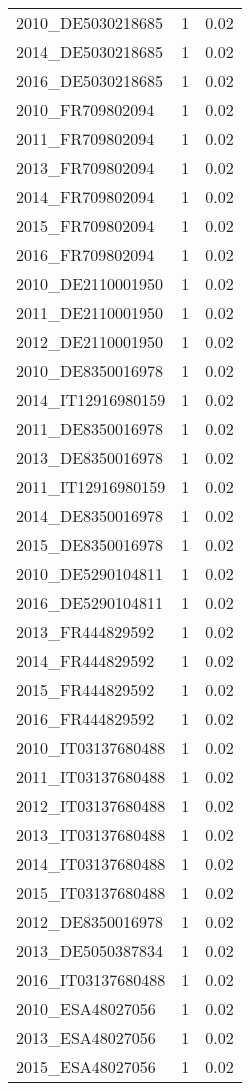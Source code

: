 \begin{table*}[htbp]
\begin{tabular}{lrr}
2010_DE5030218685 & 1 & 0.02 \\
2014_DE5030218685 & 1 & 0.02 \\
2016_DE5030218685 & 1 & 0.02 \\
2010_FR709802094 & 1 & 0.02 \\
2011_FR709802094 & 1 & 0.02 \\
2013_FR709802094 & 1 & 0.02 \\
2014_FR709802094 & 1 & 0.02 \\
2015_FR709802094 & 1 & 0.02 \\
2016_FR709802094 & 1 & 0.02 \\
2010_DE2110001950 & 1 & 0.02 \\
2011_DE2110001950 & 1 & 0.02 \\
2012_DE2110001950 & 1 & 0.02 \\
2010_DE8350016978 & 1 & 0.02 \\
2014_IT12916980159 & 1 & 0.02 \\
2011_DE8350016978 & 1 & 0.02 \\
2013_DE8350016978 & 1 & 0.02 \\
2011_IT12916980159 & 1 & 0.02 \\
2014_DE8350016978 & 1 & 0.02 \\
2015_DE8350016978 & 1 & 0.02 \\
2010_DE5290104811 & 1 & 0.02 \\
2016_DE5290104811 & 1 & 0.02 \\
2013_FR444829592 & 1 & 0.02 \\
2014_FR444829592 & 1 & 0.02 \\
2015_FR444829592 & 1 & 0.02 \\
2016_FR444829592 & 1 & 0.02 \\
2010_IT03137680488 & 1 & 0.02 \\
2011_IT03137680488 & 1 & 0.02 \\
2012_IT03137680488 & 1 & 0.02 \\
2013_IT03137680488 & 1 & 0.02 \\
2014_IT03137680488 & 1 & 0.02 \\
2015_IT03137680488 & 1 & 0.02 \\
2012_DE8350016978 & 1 & 0.02 \\
2013_DE5050387834 & 1 & 0.02 \\
2016_IT03137680488 & 1 & 0.02 \\
2010_ESA48027056 & 1 & 0.02 \\
2013_ESA48027056 & 1 & 0.02 \\
2015_ESA48027056 & 1 & 0.02 \\

\end{tabular}
\end{table*}
